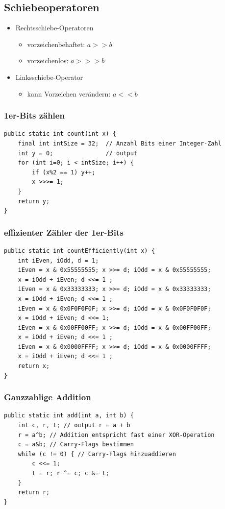 \documentclass[a4paper,10pt]{article}
\begin{document}
\subsection{Schiebeoperatoren}
\begin{itemize}
	\item Rechtsschiebe-Operatoren
		\begin{itemize}
			\item vorzeichenbehaftet: $a >> b$
			\item vorzeichenlos: $a >>> b$
		\end{itemize}
	\item Linksschiebe-Operator
		\begin{itemize}
			\item kann Vorzeichen ver\"andern:  $a << b$
		\end{itemize}
\end{itemize}

\subsubsection{1er-Bits z\"ahlen}
\begin{lstlisting}
public static int count(int x) {
	final int intSize = 32;  // Anzahl Bits einer Integer-Zahl
	int y = 0;               // output
	for (int i=0; i < intSize; i++) { 
		if (x%2 == 1) y++;
		x >>>= 1;
	}
	return y;
}

\end{lstlisting}

\subsubsection{effizienter Z\"ahler der 1er-Bits}
\begin{lstlisting}
public static int countEfficiently(int x) {
	int iEven, iOdd, d = 1;
	iEven = x & 0x55555555; x >>= d; iOdd = x & 0x55555555; 
	x = iOdd + iEven; d <<= 1 ;
	iEven = x & 0x33333333; x >>= d; iOdd = x & 0x33333333; 
	x = iOdd + iEven; d <<= 1 ;	
	iEven = x & 0x0F0F0F0F; x >>= d; iOdd = x & 0x0F0F0F0F; 
	x = iOdd + iEven; d <<= 1;	
	iEven = x & 0x00FF00FF; x >>= d; iOdd = x & 0x00FF00FF; 
	x = iOdd + iEven; d <<= 1 ;
	iEven = x & 0x0000FFFF; x >>= d; iOdd = x & 0x0000FFFF; 
	x = iOdd + iEven; d <<= 1 ;	
	return x;
}
\end{lstlisting}

\subsubsection{Ganzzahlige Addition}
\begin{lstlisting}
public static int add(int a, int b) {
	int c, r, t; // output r = a + b
	r = a^b; // Addition entspricht fast einer XOR-Operation 
	c = a&b; // Carry-Flags bestimmen
	while (c != 0) { // Carry-Flags hinzuaddieren
		c <<= 1;
		t = r; r ^= c; c &= t;
	}
	return r;
}
\end{lstlisting}
\end{document}
